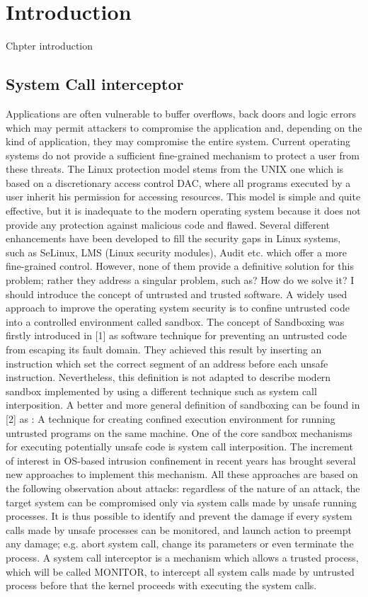 \chapter{Introduction}
Chpter introduction 

\section{System Call interceptor}
Applications are often vulnerable to buffer overflows, back doors and logic errors which may permit attackers to compromise the application and, depending on the kind of application, they may compromise the entire system. Current operating systems do not provide a sufficient fine-grained mechanism to protect a user from these threats.  The Linux protection model stems from the UNIX one which is based on a discretionary access control DAC, where all programs executed by a user inherit his permission for accessing resources. This model is simple and quite effective, but it is inadequate to the modern operating system because it does not provide any protection against malicious code and flawed.  Several different enhancements have been developed to fill the security gaps in Linux systems, such as SeLinux, LMS (Linux security modules), Audit etc. which offer a more fine-grained control.  However, none of them provide a definitive solution for this problem; rather they address a singular problem, such as? 
How do we solve it?
I should introduce the concept of untrusted and trusted software. 
A widely used approach to improve the operating system security is to confine untrusted code into a controlled environment called sandbox.  The concept of Sandboxing was firstly introduced in [1] as software technique for preventing an untrusted code from escaping its fault domain. They achieved this result by inserting an instruction which set the correct segment of an address before each unsafe instruction.  Nevertheless, this definition is not adapted to describe modern sandbox implemented by using a different technique such as system call interposition. A better and more general definition of sandboxing can be found in [2] as : 
A technique for creating confined execution environment for running untrusted programs on the same machine.
One of the core sandbox mechanisms for executing potentially unsafe code is system call interposition. The increment of interest in OS-based intrusion confinement in recent years has brought several new approaches to implement this mechanism.  All these approaches are based on the following observation about attacks: regardless of the nature of an attack, the target system can be compromised only via system calls made by unsafe running processes. It is thus possible to identify and prevent the damage if every system calls made by unsafe processes can be monitored, and launch action to preempt any damage; e.g. abort system call, change its parameters or even terminate the process.
 A system call interceptor is a mechanism which allows a trusted process, which will be called MONITOR, to intercept all system calls made by untrusted process before that the kernel proceeds with executing the system calls. 

